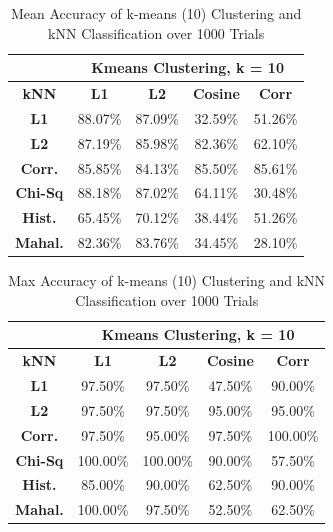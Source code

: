 \documentclass[10pt,twocolumn,letterpaper]{article}
\begin{document}
\begin{table}[H]
\caption{Mean Accuracy of k-means (10) Clustering and kNN Classification over 1000 Trials \label{tab:kmeans10}}
\footnotesize
\begin{center}
\begin{tabular}{|c| c c c c|}
\cline{2-5}
\multicolumn{1}{c|}{ } & \multicolumn{4}{|c|}{\bf Kmeans Clustering, k = 10} \\
\hline

\bf kNN &\bf L1 &\bf L2 &\bf Cosine &\bf Corr \\ [0.5ex]
\hline
\bf L1 & 88.07\% & 87.09\%  & 32.59\% & 51.26\%\\ [0.5ex]
\hline
\bf L2 & 87.19\% & 85.98\%  & 82.36\% & 62.10\%\\ [0.5ex]
\hline
\bf Corr. & 85.85\% & 84.13\%  & 85.50\% & 85.61\%\\ [0.5ex]
\hline
\bf Chi-Sq & 88.18\% & 87.02\%  & 64.11\% & 30.48\%\\ [0.5ex]
\hline
\bf Hist. & 65.45\% & 70.12\%  & 38.44\% & 51.26\%\\ [0.5ex]
\hline
\bf Mahal. & 82.36\% & 83.76\% & 34.45\% & 28.10\%\\ [0.5ex]
\hline
\end{tabular}
\end{center}
\end{table}

\begin{table}[H]
\caption{Max Accuracy of k-means (10) Clustering and kNN Classification over 1000 Trials \label{tab:kmeans_max10}}
\footnotesize
\begin{center}
\begin{tabular}{|c| c c c c|}
\cline{2-5}
\multicolumn{1}{c|}{ } & \multicolumn{4}{|c|}{\bf Kmeans Clustering, k = 10} \\
\hline

\bf kNN &\bf L1 &\bf L2 &\bf Cosine &\bf Corr \\ [0.5ex]
\hline
\bf L1 & 97.50\% & 97.50\%  & 47.50\% & 90.00\%\\ [0.5ex]
\hline
\bf L2 & 97.50\% & 97.50\%  & 95.00\% & 95.00\%\\ [0.5ex]
\hline
\bf Corr. & 97.50\% & 95.00\%  & 97.50\% & 100.00\%\\ [0.5ex]
\hline
\bf Chi-Sq & 100.00\% & 100.00\%  & 90.00\% & 57.50\%\\ [0.5ex]
\hline
\bf Hist. & 85.00\% & 90.00\%  & 62.50\% & 90.00\%\\ [0.5ex]
\hline
\bf Mahal. & 100.00\% & 97.50\% & 52.50\% & 62.50\%\\ [0.5ex]
\hline
\end{tabular}
\end{center}
\end{table}
\end{document}

